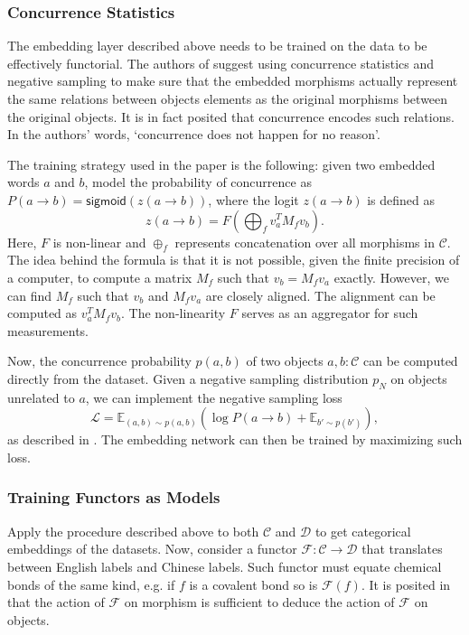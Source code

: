 \documentclass[12pt,a4paper,openright,twoside]{report}
\theoremstyle{plain}
\theoremstyle{definition}
\begin{document}
\subsubsection{Concurrence Statistics}

The embedding layer described above needs to be trained on the data to be effectively functorial. The authors of \cite{sheshmani2021categorical} suggest using concurrence statistics and negative sampling to make sure that the embedded morphisms actually represent the same relations between objects elements as the original morphisms between the original objects. It is in fact posited that concurrence encodes such relations. In the authors' words, \lq  concurrence does not happen for no reason\rq.


The training strategy used in the paper is the following: given two embedded words $a$ and $b$, model the probability of concurrence as $P(a \to b) = \mathsf{sigmoid}(z(a \to b))$, where the logit $z(a \to b)$ is defined as
\[z(a \to b) = F\left(\bigoplus_f v_a^TM_fv_b \right).\]
Here, $F$ is non-linear and $\oplus_f$ represents concatenation over all morphisms in $\mathcal{C}$. The idea behind the formula is that it is not possible, given the finite precision of a computer, to compute a matrix $M_f$ such that $v_b = M_fv_a$ exactly. However, we can find $M_f$ such that $v_b$ and $M_fv_a$ are closely aligned. The alignment can be computed as $v_a^TM_fv_b$. The non-linearity $F$ serves as an aggregator for such measurements.


Now, the concurrence probability $p(a,b)$ of two objects $a,b : \mathcal{C}$ can be computed directly from the dataset. Given a negative sampling distribution $p_N$ on objects unrelated to $a$, we can implement the negative sampling loss
\[\mathcal{L} = \mathbb{E}_{(a,b) \sim p(a,b)}\left(\log P(a \to b) + \mathbb{E}_{b' \sim p(b')}\right),\]
as described in \cite{sheshmani2021categorical}. The embedding network can then be trained by maximizing such loss.


\subsubsection{Training Functors as Models}

Apply the procedure described above to both $\mathcal{C}$ and $\mathcal{D}$ to get categorical embeddings of the datasets. Now, consider a functor $\mathcal{F}: \mathcal{C} \to \mathcal{D}$ that translates between English labels and Chinese labels. Such functor must equate chemical bonds of the same kind, e.g. if $f$ is a covalent bond so is $\mathcal{F}(f)$. It is posited in \cite{sheshmani2021categorical} that the action of $\mathcal{F}$ on morphism is sufficient to deduce the action of $\mathcal{F}$ on objects.
\end{document}
